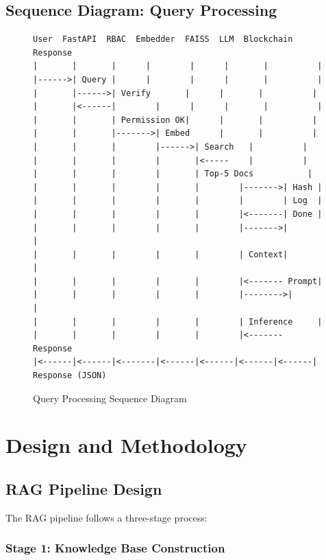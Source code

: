 \documentclass[12pt,singleside,a4paper]{article}
\begin{document}
\subsection{Sequence Diagram: Query Processing}

\begin{figure}[H]
\centering
\begin{verbatim}
User  FastAPI  RBAC  Embedder  FAISS  LLM  Blockchain  Response
|       |       |      |        |      |       |          |
|------>| Query |      |        |      |       |          |
|       |------>| Verify       |      |       |          |
|       |<------|        |      |      |       |          |
|       |       | Permission OK|      |       |          |
|       |       |------->| Embed      |       |          |
|       |       |        |------>| Search   |          |
|       |       |        |       |<-----    |          |
|       |       |        |       | Top-5 Docs           |
|       |       |        |       |        |------->| Hash |
|       |       |        |       |        |        | Log  |
|       |       |        |       |        |<-------| Done |
|       |       |        |       |        |------->|       |
|       |       |        |       |        | Context|       |
|       |       |        |       |        |<------- Prompt|
|       |       |        |       |        |-------->|       |
|       |       |        |       |        | Inference     |
|       |       |        |       |        |<------- Response
|<------|<------|<-------|<------|<------|<------|<------|
Response (JSON)
\end{verbatim}
\caption{Query Processing Sequence Diagram}
\end{figure}

\pagebreak

\section{Design and Methodology}

\subsection{RAG Pipeline Design}

The RAG pipeline follows a three-stage process:

\subsubsection{Stage 1: Knowledge Base Construction}
\end{document}
